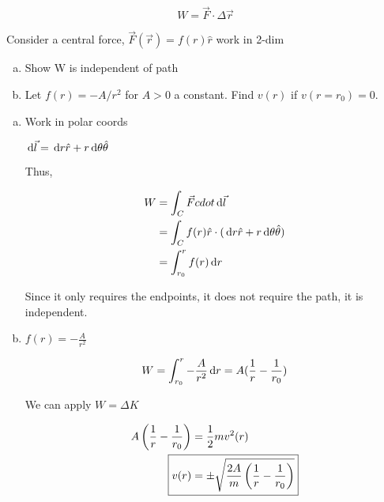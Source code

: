 \begin{sol}
	\begin{equation}
		W = \vec F \cdot \Delta \vec r
	\end{equation}
\end{sol}

\begin{example}
	Consider a central force, $\vec F(\vec r) = f(r) \hat r$ work in 2-dim

	\begin{enumerate}[(a)]
		\item Show W is independent of path
		\item Let $f(r) = - A/r^2$ for $A > 0$ a constant. Find $v(r)$ if $v(r = r_0) = 0$.
	\end{enumerate}
\end{example}

\begin{sol}
	\begin{enumerate}[(a)]
		\item Work in polar coords
		
		$\D \vec l = \D r \hat r + r \D \theta \hat \theta$

		Thus, 

		\begin{align}
			W &= \int_C \vec F cdot \D \vec l\\
			&= \int_C f(r) \hat r \cdot (\D r \hat r + r \D \theta \hat \theta)\\
			&= \int_{r_0}^r f(r) \D r
		\end{align}

		Since it only requires the endpoints, it does not require the path, it is independent.

		\item $f(r) = -\frac{A}{r^2}$
		
		\begin{equation}
			W = \int_{r_0}^r -\frac{A}{r^2} \D r = A(\frac{1}{r} - \frac{1}{r_0})
		\end{equation}

		We can apply $W = \Delta K$

		\begin{align}
			A\left(\frac{1}{r} - \frac{1}{r_0}\right) &= \frac{1}{2}mv^2(r)\\
			\Aboxed{v(r) &= \pm \sqrt{\frac{2A}{m}\left(\frac{1}{r} - \frac{1}{r_0}\right)}}
		\end{align}
	\end{enumerate}
\end{sol}

